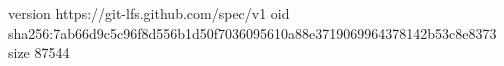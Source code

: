 version https://git-lfs.github.com/spec/v1
oid sha256:7ab66d9c5c96f8d556b1d50f7036095610a88e3719069964378142b53c8e8373
size 87544
